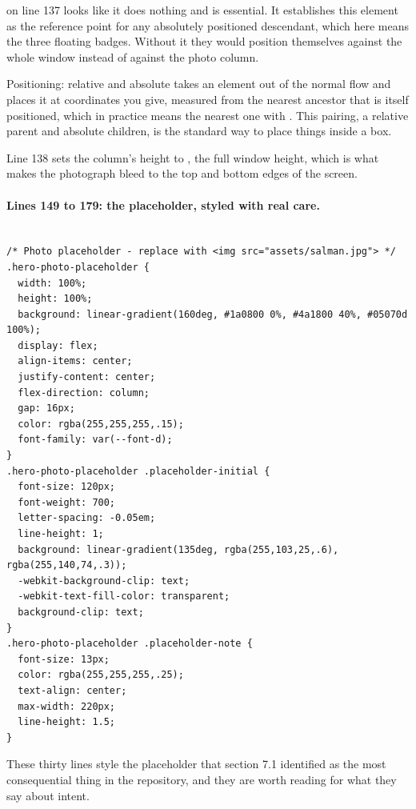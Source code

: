  on line 137 looks like it does nothing and is essential.
It establishes this element as the reference point for any absolutely positioned
descendant, which here means the three floating badges. Without it they would
position themselves against the whole window instead of against the photo column.

\begin{jargon}{Positioning: relative and absolute}
 takes an element out of the normal flow and places it at
coordinates you give, measured from the nearest ancestor that is itself positioned,
which in practice means the nearest one with . This
pairing, a relative parent and absolute children, is the standard way to place
things inside a box.
\end{jargon}

Line 138 sets the column's height to , the full window height, which is
what makes the photograph bleed to the top and bottom edges of the screen.

\paragraph{Lines 149 to 179: the placeholder, styled with real care.}

\begin{lstlisting}[firstnumber=149,caption={\file{css/site.css}, lines 149--179}]

/* Photo placeholder - replace with <img src="assets/salman.jpg"> */
.hero-photo-placeholder {
  width: 100%;
  height: 100%;
  background: linear-gradient(160deg, #1a0800 0%, #4a1800 40%, #05070d 100%);
  display: flex;
  align-items: center;
  justify-content: center;
  flex-direction: column;
  gap: 16px;
  color: rgba(255,255,255,.15);
  font-family: var(--font-d);
}
.hero-photo-placeholder .placeholder-initial {
  font-size: 120px;
  font-weight: 700;
  letter-spacing: -0.05em;
  line-height: 1;
  background: linear-gradient(135deg, rgba(255,103,25,.6), rgba(255,140,74,.3));
  -webkit-background-clip: text;
  -webkit-text-fill-color: transparent;
  background-clip: text;
}
.hero-photo-placeholder .placeholder-note {
  font-size: 13px;
  color: rgba(255,255,255,.25);
  text-align: center;
  max-width: 220px;
  line-height: 1.5;
}
\end{lstlisting}

These thirty lines style the placeholder that section 7.1 identified as the most
consequential thing in the repository, and they are worth reading for what they say
about intent.

